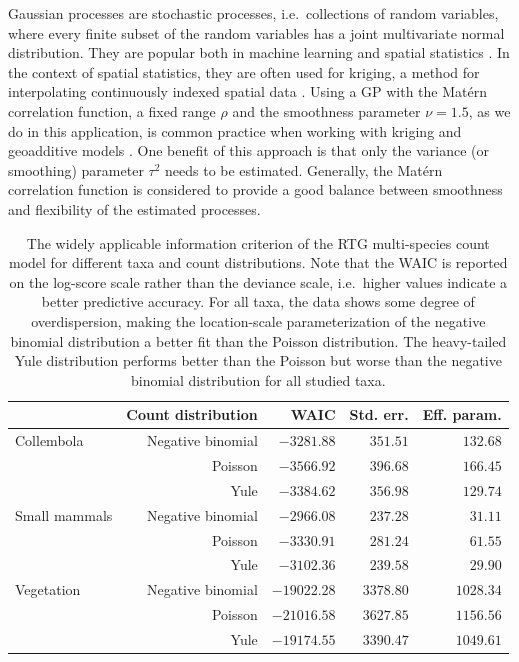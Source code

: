 \documentclass{article}
\begin{document}
Gaussian processes are stochastic processes, i.e.~collections of random variables, where every finite subset of the random variables has a joint multivariate normal distribution. They are popular both in machine learning and spatial statistics \citep{rasmussenGaussian2005}. In the context of spatial statistics, they are often used for kriging, a method for interpolating continuously indexed spatial data \citep{cressieStatistics1993}. Using a GP with the Matérn correlation function, a fixed range $\rho$ and the smoothness parameter $\nu = 1.5$, as we do in this application, is common practice when working with kriging and geoadditive models \citep{kammannGeoadditive2003}. One benefit of this approach is that only the variance (or smoothing) parameter $\tau^2$ needs to be estimated. Generally, the Matérn correlation function is considered to provide a good balance between smoothness and flexibility of the estimated processes.

\begin{table}
\centering
\caption{The widely applicable information criterion of the RTG multi-species count model for different taxa and count distributions. Note that the WAIC is reported on the log-score scale rather than the deviance scale, i.e.~higher values indicate a better predictive accuracy. For all taxa, the data shows some degree of overdispersion, making the location-scale parameterization of the negative binomial distribution a better fit than the Poisson distribution. The heavy-tailed Yule distribution performs better than the Poisson but worse than the negative binomial distribution for all studied taxa.}
\label{tab:rtg-waic}
\begin{tabular}{lrrrr}
\toprule
              & Count distribution &                 WAIC & Std. err. & Eff. param. \\
\midrule
Collembola    &  Negative binomial &  $\mathbf{-3281.88}$ &  $351.51$ &    $132.68$ \\
              &            Poisson &           $-3566.92$ &  $396.68$ &    $166.45$ \\
              &               Yule &           $-3384.62$ &  $356.98$ &    $129.74$ \\
\midrule
Small mammals &  Negative binomial &  $\mathbf{-2966.08}$ &  $237.28$ &     $31.11$ \\
              &            Poisson &           $-3330.91$ &  $281.24$ &     $61.55$ \\
              &               Yule &           $-3102.36$ &  $239.58$ &     $29.90$ \\
\midrule
Vegetation    &  Negative binomial & $\mathbf{-19022.28}$ & $3378.80$ &   $1028.34$ \\
              &            Poisson &          $-21016.58$ & $3627.85$ &   $1156.56$ \\
              &               Yule &          $-19174.55$ & $3390.47$ &   $1049.61$ \\
\bottomrule
\end{tabular}
\end{table}
\end{document}

